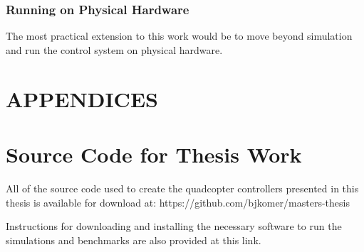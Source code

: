 \documentclass[letterpaper,12pt,titlepage,oneside,final]{book}
\let\origdoublepage\cleardoublepage
\newcommand{\clearemptydoublepage}{%
  \clearpage{\pagestyle{empty}\origdoublepage}}
\let\cleardoublepage\clearemptydoublepage
\begin{document}
\subsection{Running on Physical Hardware}

The most practical extension to this work would be to move beyond simulation and run the control system on physical hardware.

\appendix

\chapter*{APPENDICES}
\chapter[Link to the Source Code]{Source Code for Thesis Work}
\label{AppendixA}

All of the source code used to create the quadcopter controllers presented in this thesis is available for download at: https://github.com/bjkomer/masters-thesis

Instructions for downloading and installing the necessary software to run the simulations and benchmarks are also provided at this link.




\cleardoublepage %
\renewcommand*{\bibname}{References}
\end{document}
